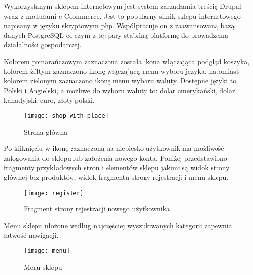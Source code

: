 	\par Wykorzystanym sklepem internetowym jest system zarządzania treścią Drupal wraz z modułami e-Coommerce. Jest to popularny silnik sklepu internetowego napisany w języku skryptowym php. Współpracuje on z zaawansowaną bazą danych PostgreSQL co czyni z tej pary stabilną platformę do prowadzenia działalności gospodarczej.
					
	\par Kolorem pomarańczowym zaznaczona została ikona włączająca podgląd koszyka, kolorem żółtym zaznaczono ikonę włączającą menu wyboru języka, natomiast kolorem zielonym zaznaczono ikonę menu wyboru waluty. Dostępne języki to Polski i Angielski, a możliwe do wyboru waluty to: dolar amerykański, dolar kanadyjski, euro, złoty polski.
					
	\begin{figure}[H]
		\centering
		\texttt{[image: shop\_with\_place]}
		\caption{Strona główna}
	\end{figure}
					
	\par Po kliknięciu w ikonę zaznaczoną na niebiesko użytkownik ma możliwość zalogowania do sklepu lub założenia nowego konta. Poniżej przedstawiono fragmenty przykładowych stron i elementów sklepu jakimi są widok strony głównej bez produktów, widok fragmentu strony rejestracji i menu sklepu.
					
	\begin{figure}[H]
		\centering
		\texttt{[image: register]}
		\caption{Fragment strony rejestracji nowego użytkownika}
	\end{figure}
					
	\par Menu sklepu ułożone według najczęściej wyszukiwanych kategorii zapewnia łatwość nawigacji.
					
	\begin{figure}[H]
		\centering
		\texttt{[image: menu]}
		\caption{Menu sklepu}
	\end{figure}
 
